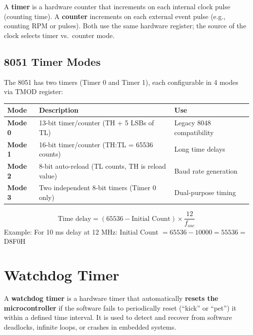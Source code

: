 \documentclass[12pt,a4paper]{article}
\renewcommand{\arraystretch}{1.45}
\begin{document}
\begin{tcolorbox}[defbox, title={\textbf{Timer / Counter}}]
A \textbf{timer} is a hardware counter that increments on each internal clock pulse (counting time). A \textbf{counter} increments on each external event pulse (e.g., counting RPM or pulses). Both use the same hardware register; the source of the clock selects timer vs.\ counter mode.
\end{tcolorbox}

\subsection{8051 Timer Modes}

The 8051 has two timers (Timer 0 and Timer 1), each configurable in 4 modes via TMOD register:

\par\noindent
{\renewcommand{\arraystretch}{1.55}%
\begin{tabularx}{\linewidth}{|B{2.5cm}|Y|Y|}
\hline
\textbf{Mode} & \textbf{Description} & \textbf{Use} \\
\hline
\textbf{Mode 0} & 13-bit timer/counter (TH + 5 LSBs of TL) & Legacy 8048 compatibility \\
\hline
\textbf{Mode 1} & 16-bit timer/counter (TH:TL = 65536 counts) & Long time delays \\
\hline
\textbf{Mode 2} & 8-bit auto-reload (TL counts, TH is reload value) & Baud rate generation \\
\hline
\textbf{Mode 3} & Two independent 8-bit timers (Timer 0 only) & Dual-purpose timing \\
\hline
\end{tabularx}}

\begin{tcolorbox}[formulabox, title={\textbf{Timer Delay Calculation (8051, Mode 1)}}]
\[
\text{Time delay} = (65536 - \text{Initial Count}) \times \frac{12}{f_{osc}}
\]
Example: For 10 ms delay at 12 MHz: Initial Count $= 65536 - 10000 = 55536 =$ D8F0H
\end{tcolorbox}

\section{Watchdog Timer}

\begin{tcolorbox}[defbox, title={\textbf{Watchdog Timer (WDT)}}]
A \textbf{watchdog timer} is a hardware timer that automatically \textbf{resets the microcontroller} if the software fails to periodically reset (``kick'' or ``pet'') it within a defined time interval. It is used to detect and recover from software deadlocks, infinite loops, or crashes in embedded systems.
\end{tcolorbox}
\end{document}
